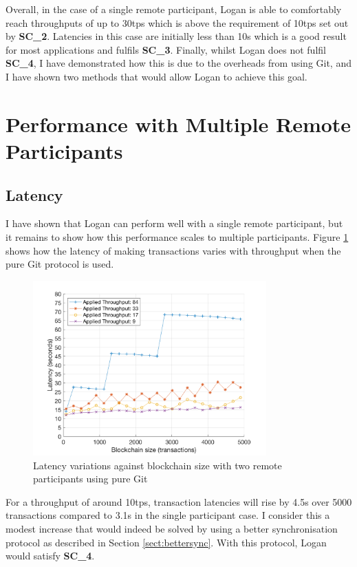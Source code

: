 \documentclass[12pt,a4paper,twoside,openright]{report}
\begin{document}
	Overall, in the case of a single remote participant, Logan is able to comfortably reach throughputs of up to 30tps which is above the requirement of 10tps set out by \textbf{SC\_2}. 
	Latencies in this case are initially less than 10s which is a good result for most applications and fulfils \textbf{SC\_3}.
	Finally, whilst Logan does not fulfil \textbf{SC\_4}, I have demonstrated how this is due to the overheads from using Git, and I have shown two methods that would allow Logan to achieve this goal.

	\section{Performance with Multiple Remote Participants}
	\subsection{Latency}
	I have shown that Logan can perform well with a single remote participant, but it remains to show how this performance scales to multiple participants. 
	Figure \ref{figs:tworems} shows how the latency of making transactions varies with throughput when the pure Git protocol is used.
	\begin{figure}
		\centering
		\includegraphics[width=0.8\textwidth]{figs/2latencies_sizes_throughputs.png}
		\caption{Latency variations against blockchain size with two remote participants using pure Git}
		\label{figs:tworems}
	\end{figure}
	For a throughput of around 10tps, transaction latencies will rise by 4.5s over 5000 transactions compared to 3.1s in the single participant case.
	I consider this a modest increase that would indeed be solved by using a better synchronisation protocol as described in Section \ref{sect:bettersync}. 
	With this protocol, Logan would satisfy \textbf{SC\_4}.\\
\end{document}
